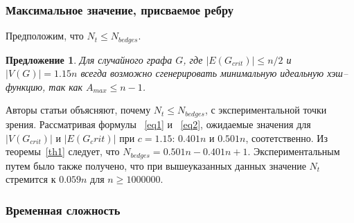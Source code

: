 \documentclass[specialist,
               substylefile = spbu.rtx,
               subf,href,colorlinks=true, 12pt]{disser}
\newtheorem{mycon}{Предложение}
\begin{document}
\subsubsection{Максимальное значение, присваемое ребру} \label{secmax}

Предположим, что $N_{t} \leq N_{bedges}$.

\begin{mycon}
Для случайного графа $G$, где $|E(G_{crit})| \leq n/2$ и $|V(G)| = 1.15n$ всегда возможно сгенерировать минимальную идеальную хэш--функцию, так как $A_{max} \leq n - 1$.
\end{mycon}

Авторы статьи объясняют, почему $N_{t} \leq N_{bedges}$, с экспериментальной точки зрения. Рассматривая формулы ~\ref{eq1} и ~\ref{eq2}, ожидаемые значения для $|V(G_{crit})|$ и $|E(G_crit)|$ при $c = 1.15$: $0.401n$ и $0.501n$, соотетственно. Из теоремы~\ref{th1} следует, что $N_{bedges} = 0.501n - 0.401n + 1$. Экспериментальным путем было также получено, что при вышеуказанных данных значение $N_{t}$ стремится к $0.059n$ для $n \geq 1000000$.

\subsubsection{Временная сложность}
\end{document}
